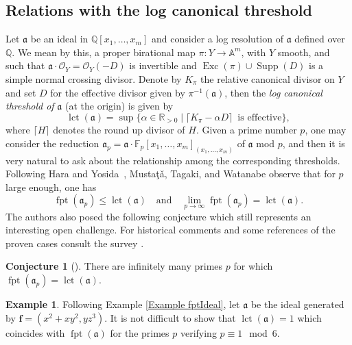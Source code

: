 \documentclass[12pt]{amsart}
\theoremstyle{definition}
\newtheorem{example}[theorem]{Example}
\newtheorem{conjecture}[theorem]{Conjecture}
\numberwithin{equation}{subsection}
\DeclareMathOperator{\fpt}{fpt}
\newcommand{\lct}{{\operatorname{lct}}}
\newcommand{\QQ}{\mathbb{Q}}
\newcommand{\FF}{\mathbb{F}}
\newcommand{\RR}{\mathbb{R}}
\newcommand{\fa}{\mathfrak{a}}
\newcommand{\Bf}{\boldsymbol{f}}
\newcommand{\Supp}{\operatorname{Supp}}
\renewcommand{\!}[1]{{\color{red}\text{\Huge$\star$ }#1}}
\begin{document}
\subsection{Relations with the log canonical threshold}\label{SSec:Relations}
Let $\mathfrak{a}$ be an ideal in  $\QQ[x_1,\ldots, x_m]$ and consider a log resolution of $\fa$ defined over $\QQ$. We mean by this, a proper birational map $\pi: Y \to \mathbb{A}^m$, with $Y$ smooth, and such that $\fa\cdot \mathcal{O}_{Y}=\mathcal{O}_{Y}(-D)$ is invertible and $\operatorname{Exc}(\pi) \cup \Supp(D)$ is a simple normal crossing divisor. Denote by $K_\pi$ the relative canonical divisor on $Y$ and set $D$ for the effective divisor given by $\pi^{-1}(\fa)$, then the \textit{log canonical threshold of} $\fa$ (at the origin) is given by
\[\lct(\fa) = \sup\{\alpha \in \RR_{>0} \mid  \lceil K_\pi -\alpha D\rceil \,\text{ is effective}\},
\]
where $\lceil H\rceil$ denotes the round up divisor of $H$. Given a prime number $p$, one may consider the reduction $\fa_p=\fa\cdot\FF_p[x_1,\ldots, x_m]_{(x_1,\ldots,x_m)}$ of $\fa$ mod $p$, and then it is very natural to ask about the relationship among the corresponding thresholds. Following Hara and Yosida~\cite{HaYo}, Musta\c{t}\v{a}, Tagaki, and Watanabe \cite[Theorem 3.3]{MTW} observe that for $p$ large enough, one has
\begin{equation}\label{Eq:ResultsMTW}
	\fpt(\fa_p)\leq \lct(\fa) \quad \text{and}\quad \lim_{p\to \infty} \fpt(\fa_p)=\lct(\fa).
\end{equation} 
The authors also posed the following conjecture which still represents an interesting open challenge. For historical comments and some references of the proven cases consult the survey \cite{BFS2013}.
\begin{conjecture}[{\cite[Conjecture 3.6]{MTW}}]\label{Conj: fptandlct}
	There are infinitely many primes $p$ for which $\fpt(\fa_p) = \lct(\fa)$.
\end{conjecture}
\begin{example}\label{Ex:ContExFptIdeal}
	Following Example \ref{Example fptIdeal}, let $\fa$ be the ideal generated by $\Bf=(x^2+xy^2,yz^3)$. It is not difficult to show that $\lct(\fa)=1$ which coincides with $\fpt(\fa)$ for the primes $p$ verifying $p \equiv 1 \mod 6$.
\end{example}
\end{document}
